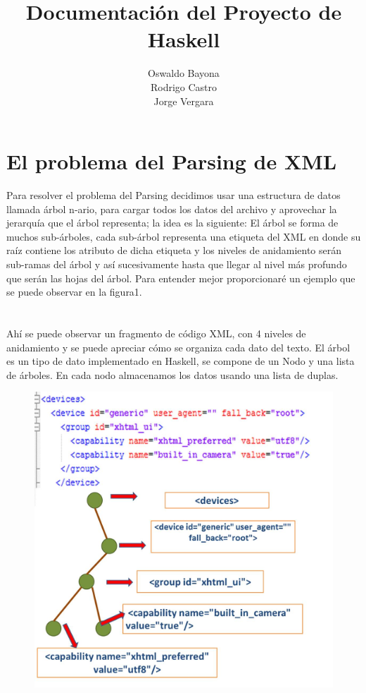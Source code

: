 \documentclass[11pt]{article} %
\title{Documentación del Proyecto de Haskell}
\author{Oswaldo Bayona\\Rodrigo Castro\\Jorge Vergara}
\begin{document}
\maketitle


\section{El problema del Parsing de XML}


Para resolver el problema del Parsing decidimos usar una estructura de datos llamada árbol n-ario, para cargar todos los datos del archivo y aprovechar la jerarquía que el árbol representa; la idea es la siguiente: El árbol se forma de muchos sub-árboles, cada sub-árbol representa una etiqueta del XML en donde su raíz contiene los atributo de dicha etiqueta y los niveles de anidamiento serán sub-ramas del árbol y así sucesivamente hasta que llegar al nivel más profundo que serán las hojas del árbol. Para entender mejor proporcionaré un ejemplo que se puede observar en la figura1.\\\\\\Ahí se puede observar un fragmento de código XML, con 4 niveles de anidamiento y se puede apreciar cómo se organiza cada dato del texto. El árbol es un tipo de dato implementado en Haskell, se compone de un Nodo y una lista de árboles. En cada nodo almacenamos los datos usando una lista de duplas.



\begin{figure}[H]
\begin{center}
\includegraphics{imagenes/imagen1}
\end{center}
\caption {}
\label{Figura 1}
\end{figure}
\end{document}
